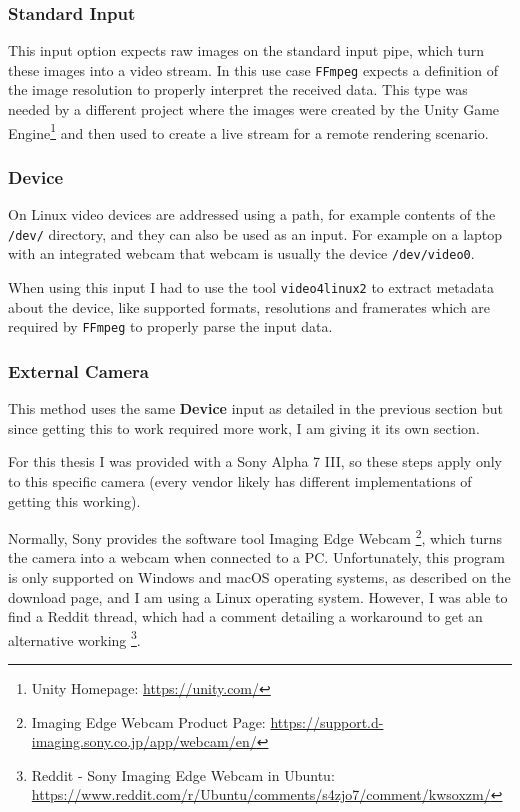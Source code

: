 \subsubsection{Standard Input}

This input option expects raw images on the standard input pipe, which turn these images into a video stream. In this use case \texttt{FFmpeg} expects a definition of the image resolution to properly interpret the received data. This type was needed by a different project where the images were created by the Unity Game Engine\footnote{Unity Homepage: \url{https://unity.com/}} and then used to create a live stream for a remote rendering scenario.

\subsubsection{Device}

On Linux video devices are addressed using a path, for example contents of the \texttt{/dev/} directory, and they can also be used as an input. For example on a laptop with an integrated webcam that webcam is usually the device \texttt{/dev/video0}.

When using this input I had to use the tool \texttt{video4linux2} to extract metadata about the device, like supported formats, resolutions and framerates which are required by \texttt{FFmpeg} to properly parse the input data.

\subsubsection{External Camera\label{sec:ext_cam}}

This method uses the same \textbf{Device} input as detailed in the previous section but since getting this to work required more work, I am giving it its own section.

For this thesis I was provided with a Sony Alpha 7 III, so these steps apply only to this specific camera (every vendor likely has different implementations of getting this working).

Normally, Sony provides the software tool Imaging Edge Webcam \footnote{Imaging Edge Webcam Product Page: \url{https://support.d-imaging.sony.co.jp/app/webcam/en/}}, which turns the camera into a webcam when connected to a PC. Unfortunately, this program is only supported on Windows and macOS operating systems, as described on the download page, and I am using a Linux operating system. However, I was able to find a Reddit thread, which had a comment detailing a workaround to get an alternative working \footnote{Reddit - Sony Imaging Edge Webcam in Ubuntu: \url{https://www.reddit.com/r/Ubuntu/comments/s4zjo7/comment/kwsoxzm/}}.

